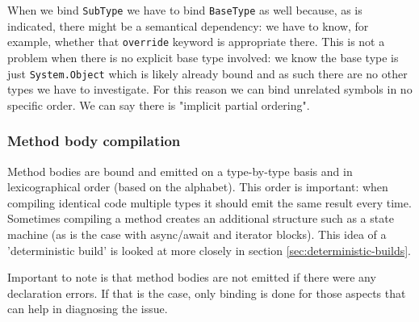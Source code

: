When we bind \texttt{SubType} we have to bind \texttt{BaseType} as well because, as is indicated, there might be a semantical dependency: we have to know, for example, whether that \texttt{override} keyword is appropriate there. This is not a problem when there is no explicit base type involved: we know the base type is just \texttt{System.Object} which is likely already bound and as such there are no other types we have to investigate. For this reason we can bind unrelated symbols in no specific order. We can say there is "implicit partial ordering".\parencite{Sadov2014}

\subsubsection{Method body compilation }
\label{sec:concur-method-body-compilation}

Method bodies are bound and emitted on a type-by-type basis and in lexicographical order (based on the alphabet). This order is important: when compiling identical code multiple types it should \gls{emit} the same result every time. Sometimes compiling a method creates an additional structure such as a state machine (as is the case with async/await and iterator blocks). This idea of a 'deterministic build' is looked at more closely in section \ref{sec:deterministic-builds}. 

Important to note is that method bodies are not emitted if there were any declaration errors. If that is the case, only binding is done for those aspects that can help in diagnosing the issue.\parencite{Sadov2014}

